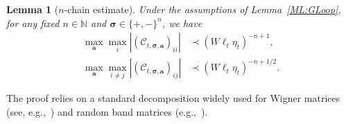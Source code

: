 \documentclass[10pt,reqno]{article}
\theoremstyle{plain} %
\newtheorem{lemma}[theorem]{Lemma}
\theoremstyle{remark}
\numberwithin{equation}{section}
\begin{document}
\begin{lemma}[$n$-chain estimate]\label{lem_GbEXP_n2}  
Under the assumptions of Lemma~\ref{ML:GLoop}, for any fixed \( n \in \mathbb{N} \) and \( \boldsymbol{\sigma} \in \{+, -\}^n \), we have
\begin{align}\label{res_XICdi}
    \max_{\mathbf{a}} \max_i \left| \left( \mathcal{C}_{t, \boldsymbol{\sigma}, \mathbf{a}} \right)_{ii} \right| 
    &\prec \left(W \ell_t \eta_t\right)^{-n+1}, \\\label{res_XICoff}
    \max_{\mathbf{a}} \max_{i \ne j} \left| \left( \mathcal{C}_{t, \boldsymbol{\sigma}, \mathbf{a}} \right)_{ij} \right| 
    &\prec \left(W \ell_t \eta_t\right)^{-n + 1/2}.
\end{align}
\end{lemma}

The proof relies on a standard decomposition widely used for Wigner matrices (see, e.g.,~\cite{erdHos2012rigidity}) and random band matrices (e.g.,~\cite{Average_fluc}).
\end{document}
